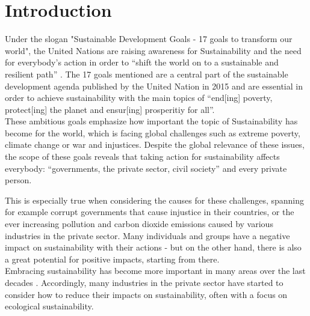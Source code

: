 \chapter{Introduction}
Under the slogan "Sustainable Development Goals - 17 goals to transform our world"\cite{nino_sustainable_2017}, the United Nations are raising awareness for Sustainability and the need for everybody's action in order to "`shift the world on to a sustainable and resilient path"' \cite{UN_transform_15}%
. The 17 goals mentioned are a central part of the sustainable development agenda published by the United Nation in 2015 \cite{UN_transform_15}%
 and are essential in order to achieve sustainability with the main topics of "`end[ing] poverty, protect[ing] the planet and ensur[ing] prosperitiy for all"'\cite{nino_sustainable_2017}.\\
These ambitious goals emphasize how important the topic of Sustainability has become for the world, which is facing global challenges such as extreme poverty, climate change or war and injustices. Despite the global relevance of these issues, the scope of these goals reveals that taking action for sustainability affects everybody: "`governments, the private sector, civil society"'\cite{nino_sustainable_2017} and every private person. 

This is especially true when considering the causes for these challenges, spanning for example corrupt governments that cause injustice in their countries, or the ever increasing pollution and carbon dioxide emissions caused by various industries in the private sector. Many individuals and groups %
 have a negative impact on sustainability with their actions - but on the other hand, there is also a great potential for positive impacts, starting from there.\\
 Embracing sustainability has become more important in many areas over the last decades %
. Accordingly, many industries in the private sector have started to consider how to reduce their impacts on sustainability, often with a focus on ecological sustainability. %

